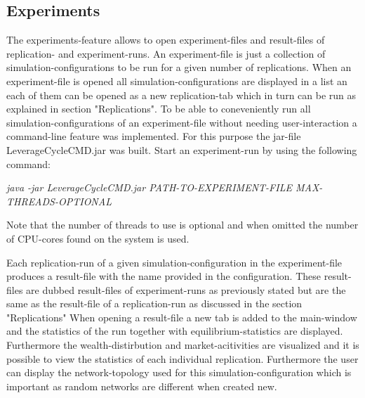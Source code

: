 \documentclass[Bachelorarbeit.tex]{subfiles}
\begin{document}
\subsection{Experiments}
The experiments-feature allows to open experiment-files and result-files of replication- and experiment-runs. An experiment-file is just a collection of simulation-configurations to be run for a given number of replications. When an experiment-file is opened all simulation-configurations are displayed in a list an each of them can be opened as a new replication-tab which in turn can be run as explained in section "Replications". To be able to coneveniently run all simulation-configurations of an experiment-file without needing user-interaction a command-line feature was implemented. For this purpose the jar-file LeverageCycleCMD.jar was built. Start an experiment-run by using the following command:

\begin{center}
\textit{java -jar LeverageCycleCMD.jar PATH-TO-EXPERIMENT-FILE MAX-THREADS-OPTIONAL}
\end{center}

Note that the number of threads to use is optional and when omitted the number of CPU-cores found on the system is used. 

\medskip

Each replication-run of a given simulation-configuration in the experiment-file produces a result-file with the name provided in the configuration. These result-files are dubbed result-files of experiment-runs as previously stated but are the same as the result-file of a replication-run as discussed in the section "Replications"
When opening a result-file a new tab is added to the main-window and the statistics of the run together with equilibrium-statistics are displayed. Furthermore the wealth-distirbution and market-acitivities are visualized and it is possible to view the statistics of each individual replication. Furthermore the user can display the network-topology used for this simulation-configuration which is important as random networks are different when created new.
\end{document}
